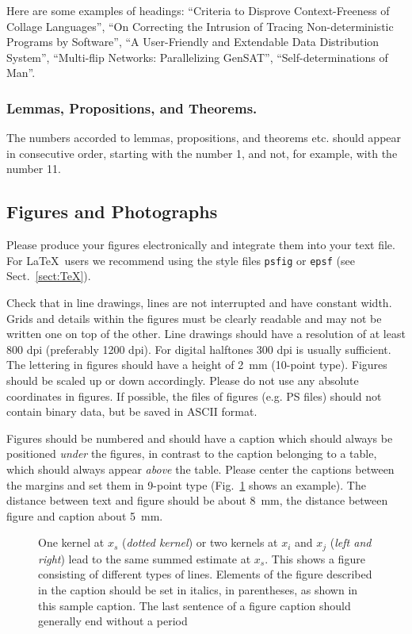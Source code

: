 \documentclass[runningheads]{llncs}
\begin{document}
Here are
some examples of headings: ``Criteria to Disprove Context-Freeness of
Collage Languages'', ``On Correcting the Intrusion of Tracing
Non-deterministic Programs by Software'', ``A User-Friendly and
Extendable Data Distribution System'', ``Multi-flip Networks:
Parallelizing GenSAT'', ``Self-determinations of Man''.

\subsubsection{Lemmas, Propositions, and Theorems.}

The numbers accorded to lemmas, propositions, and theorems etc. should
appear in consecutive order, starting with the number 1, and not, for
example, with the number 11.

\subsection{Figures and Photographs}
\label{sect:figures}

Please produce your figures electronically
and integrate them into your text file. For \LaTeX\ users
we recommend using the style files \verb+psfig+ or \verb+epsf+
(see Sect.~\ref{sect:TeX}).

Check that in line drawings, lines are not
interrupted and have constant width. Grids and details within the
figures must be clearly readable and may not be written one on top of
the other. Line drawings should have a resolution of at least 800 dpi
(preferably 1200 dpi).
For digital halftones 300 dpi is usually sufficient.
The lettering in figures should have a height of 2~mm (10-point type).
Figures should be scaled up or down accordingly.
Please do not use any absolute coordinates in figures.
If possible, the files of figures (e.g. PS files) should not contain
binary data, but be saved in ASCII format.

Figures should be numbered and should have a caption which should
always be positioned {\it under} the figures, in contrast to the caption
belonging to a table, which should always appear {\it above} the table.
Please center the captions between the margins and set them in
9-point type
(Fig.~\ref{fig:example} shows an example).
The distance between text and figure should be about 8~mm, the
distance between figure and caption about 5~mm.
\begin{figure}
\centerline{}
\caption{One kernel at $x_s$ ({\it dotted kernel}) or two kernels at
$x_i$ and $x_j$ ({\it left and right}) lead to the same summed estimate
at $x_s$. This shows a figure consisting of different types of
lines. Elements of the figure described in the caption should be set in
italics,
in parentheses, as shown in this sample caption. The last
sentence of a figure caption should generally end without a period}
\label{fig:example}
\end{figure}
\end{document}
